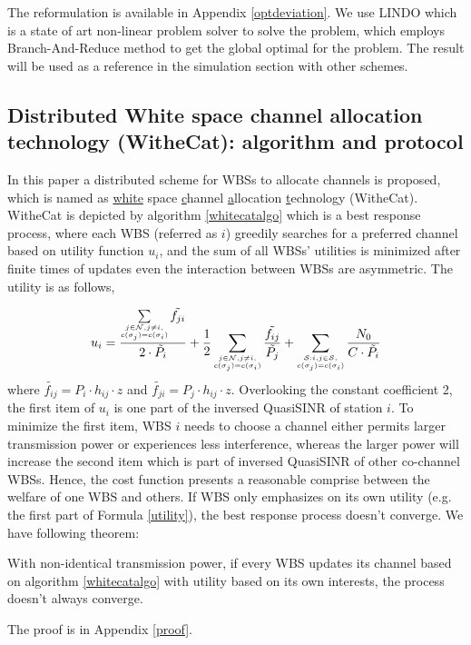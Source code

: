 The reformulation is available in Appendix \ref{optdeviation}. We use LINDO\cite{lindo} which is a state of art non-linear problem solver to solve the problem, which employs Branch-And-Reduce method to get the global optimal for the problem. %
The result will be used as a reference in the simulation section with other schemes. 



\subsection{Distributed White space channel allocation technology (WitheCat): algorithm and protocol}
\label{whitecat}
In this paper a distributed scheme for WBSs to allocate channels is proposed,  which is named as \underline{white} space \underline{c}hannel \underline{a}llocation \underline{t}echnology (WitheCat). WitheCat is depicted by algorithm \ref{whitecatalgo} which is a best response process, where each WBS (referred as $i$) greedily searches for a preferred channel based on utility function $u_i$, and the sum of all WBSs' utilities is minimized after finite times of updates even the interaction between WBSs are asymmetric. The utility is as follows,

\begin{equation}
\label{utility}
u_i =\dfrac{\sum\limits_{\tiny\substack{j\in \mathcal{N}, j\ne i,\\ c(\sigma_j)=c(\sigma_i)}}\tilde{f_{ji}}}{2\cdot \tilde{P_i}} + \dfrac{1}{2}\sum_{\tiny\substack{j\in \mathcal{N}, j\ne i,\\ c(\sigma_j)=c(\sigma_i)}}\dfrac{\tilde{f_{ij}}}{\tilde{P_j}} + \sum_{\tiny\substack{\mathcal{S}:i,j\in \mathcal{S},\\ c(\sigma_j)=c(\sigma_i)}}\dfrac{N_0}{C\cdot \tilde{P_i}}\\
\end{equation}
where $\tilde{f_{ij}}= P_i\cdot h_{ij}\cdot z$ and $\tilde{f_{ji}}= P_j\cdot h_{ij}\cdot z$.
Overlooking the constant coefficient 2, the first item of $u_i$ is one part of the inversed QuasiSINR of station $i$. To minimize the first item, WBS $i$ needs to choose a channel either permits larger transmission power or experiences less interference, whereas the larger power will increase the second item which is part of inversed QuasiSINR of other co-channel WBSs. Hence, the cost function presents a reasonable comprise between the welfare of one WBS and others. If WBS only emphasizes on its own utility (e.g. the first part of Formula \ref{utility}), the best response process doesn't converge. We have following theorem:
\begin{theorem}
\label{noconvergence}
With non-identical transmission power, if every WBS updates its channel based on algorithm \ref{whitecatalgo} with utility based on its own interests, the process doesn't always converge.
\end{theorem}
The proof is in Appendix \ref{proof}.


